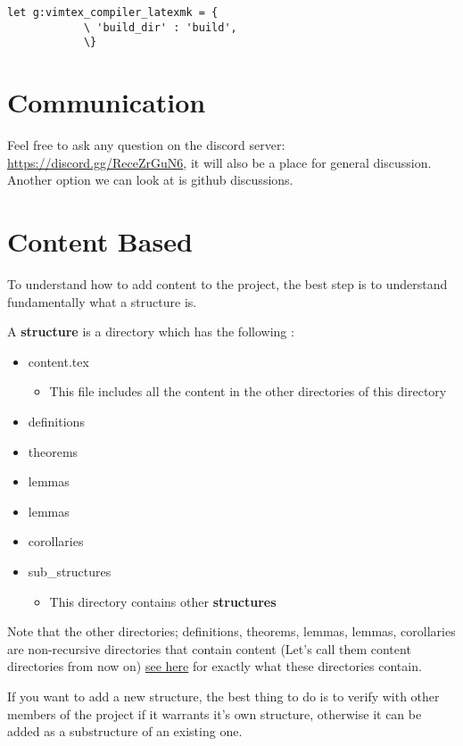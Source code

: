 \begin{lstlisting}
let g:vimtex_compiler_latexmk = {
            \ 'build_dir' : 'build',
            \}
\end{lstlisting}

 
\section*{Communication}

Feel free to ask any question on the discord server:
\url{https://discord.gg/ReceZrGuN6}, it will also be a place for general
discussion. Another option we can look at is github discussions.

\section*{Content Based}

To understand how to add content to the project, the best step is to understand
fundamentally what a structure is.

A \textbf{structure} is a directory which has the following :
\begin{itemize}
    \item content.tex
    \begin{itemize}
        \item This file includes all the content in the other directories of
        this directory
    \end{itemize}
    \item definitions
    \item theorems
    \item lemmas
    \item lemmas
    \item corollaries
    \item sub\_structures
    \begin{itemize}
        \item This directory contains other \textbf{structures}
    \end{itemize}
\end{itemize}

Note that the other directories; definitions, theorems, lemmas, lemmas,
corollaries are non-recursive directories that contain content (Let's call them
content directories from now on) \hyperref[sec:knowledge]{see here} for exactly
what these directories contain. 

If you want to add a new structure, the best thing to do is to verify with other
members of the project if it warrants it's own structure, otherwise it can be
added as a substructure of an existing one.

